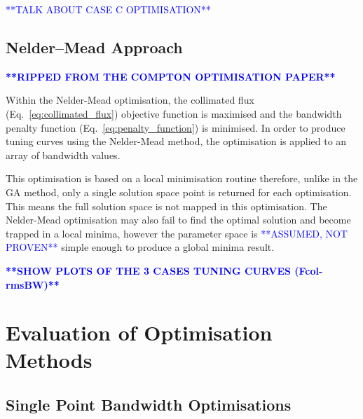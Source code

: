 \documentclass[../main.tex]{subfiles}
\begin{document}
\textcolor{blue}{**TALK ABOUT CASE C OPTIMISATION**}

\subsection{Nelder--Mead Approach}

\textcolor{blue}{\textbf{**RIPPED FROM THE COMPTON OPTIMISATION PAPER**}}

Within the Nelder-Mead optimisation, the collimated flux (Eq.~\ref{eq:collimated_flux}) objective function is maximised and the bandwidth penalty function (Eq.~\ref{eq:penalty_function}) is minimised. In order to produce tuning curves using the Nelder-Mead method, the optimisation is applied to an array of bandwidth values.

This optimisation is based on a local minimisation routine therefore, unlike in the GA method, only a single solution space point is returned for each optimisation. This means the full solution space is not mapped in this optimisation. The Nelder-Mead optimisation may also fail to find the optimal solution and become trapped in a local minima, however the parameter space is \textcolor{blue}{**ASSUMED, NOT PROVEN**} simple enough to produce a global minima result.

\textcolor{blue}{\textbf{**SHOW PLOTS OF THE 3 CASES TUNING CURVES (Fcol-rmsBW)**}}

\section{Evaluation of Optimisation Methods} 
\label{sec:evaluation_of_optimisation_methods}

\subsection{Single Point Bandwidth Optimisations}
\end{document}
